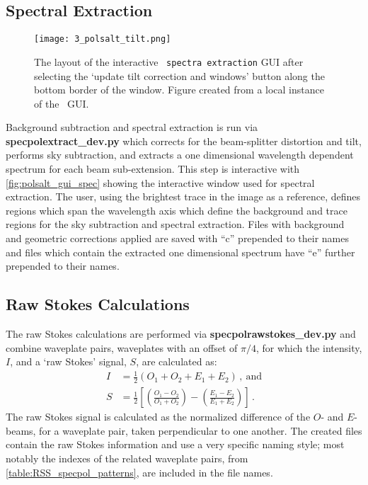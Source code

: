 \subsection{Spectral Extraction} \label{subsec:pol_spec}

\begin{figure}[t]
    \centering
    \texttt{[image: 3\_polsalt\_tilt.png]}
    \caption{
        The layout of the interactive \polsalt\ \texttt{spectra extraction} \gls{GUI} after selecting the `update tilt correction and windows' button along the bottom border of the window.
        Figure created from a local instance of the \polsalt\ \gls{GUI}.
    }
    \label{fig:polsalt_gui_spec}
\end{figure}

Background subtraction and spectral extraction is run via \textbf{spec\-pol\-extract\_dev.py} which corrects for the beam-splitter distortion and tilt, performs sky subtraction, and extracts a one dimensional wavelength dependent spectrum for each beam sub-extension.
This step is interactive with \autoref{fig:polsalt_gui_spec} showing the interactive window used for spectral extraction.
The user, using the brightest trace in the image as a reference, defines regions which span the wavelength axis which define the background and trace regions for the sky subtraction and spectral extraction.
Files with background and geometric corrections applied are saved with ``c'' prepended to their names and files which contain the extracted one dimensional spectrum have ``e'' further prepended to their names.

\subsection{Raw Stokes Calculations} \label{subsec:pol_rstokes}

The raw Stokes calculations are performed via \textbf{specpolraw\-stokes\_dev.py} and combine waveplate pairs, waveplates with an offset of $\pi/4$, for which the intensity, $I$, and a `raw Stokes' signal, $S$, are calculated as:
\begin{align} \label{eq:polsalt_rawstokes}
    I &= \frac{1}{2} (O_{1} + O_{2} + E_{1} + E_{2})\,,\ \text{and}\\
    S &= \frac{1}{2} \left[ \left( \frac{O_{1} - O_{2}}{O_{1} + O_{2}} \right) - \left( \frac{E_{1} - E_{2}}{E_{1} + E_{2}} \right) \right]\,.
\end{align}
The raw Stokes signal is calculated as the normalized difference of the $O$- and $E$-beams, for a waveplate pair, taken perpendicular to one another.
The created files contain the raw Stokes information and use a very specific naming style; most notably the indexes of the related waveplate pairs, from \autoref{table:RSS_specpol_patterns}, are included in the file names.

